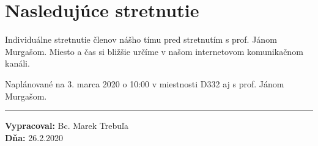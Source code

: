     \section*{Nasledujúce stretnutie}
    Individuálne stretnutie členov nášho tímu pred stretnutím s prof. Jánom\\ Murgašom. Miesto a čas si bližšie určíme v našom internetovom komunikačnom kanáli.
    
    Naplánované na 3. marca 2020 o 10:00 v miestnosti D332 aj s prof. Jánom Murgašom.
    
    \noindent\rule{15cm}{0.4pt}
   {\small 	\textbf{Vypracoval:} Bc. Marek Trebuľa\\
   \textbf{Dňa:} 26.2.2020 }
    


